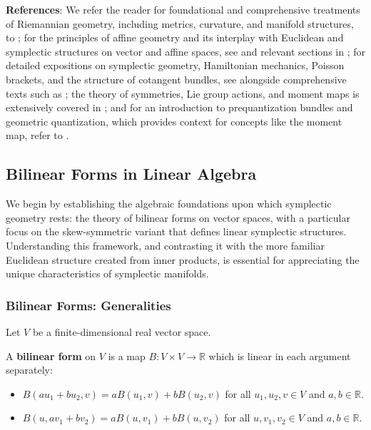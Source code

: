 \setcounter{tocdepth}{3}
\localtableofcontents

\textbf{References}: 
We refer the reader for foundational and comprehensive treatments of Riemannian geometry, including metrics, curvature, and manifold structures, to \cite{Lee2018Riemannian} \cite{DoCarmo1992Riemannian}; for the principles of affine geometry and its interplay with Euclidean and symplectic structures on vector and affine spaces, see \cite{Audin2003Geometry} and relevant sections in \cite{LibermannMarle1987Symplectic}; for detailed expositions on symplectic geometry, Hamiltonian mechanics, Poisson brackets, and the structure of cotangent bundles, see \cite{Arnold1989Mechanics} alongside comprehensive texts such as \cite{LibermannMarle1987Symplectic} \cite{GuilleminSternberg1984Symplectic}; the theory of symmetries, Lie group actions, and moment maps is extensively covered in \cite{MarsdenRatiu1999MechanicsSymmetry} \cite{GuilleminSternberg1984Symplectic} \cite{Souriau1997Structure} \cite{Olver1993LieGroups}; and for an introduction to prequantization bundles and geometric quantization, which provides context for concepts like the moment map, refer to \cite{Woodhouse1992GeometricQuantization} \cite{BatesWeinstein1997GeoQuant}.


\newpage 

\subsection{Bilinear Forms in Linear Algebra}

We begin by establishing the algebraic foundations upon which symplectic geometry rests: the theory of bilinear forms on vector spaces, with a particular focus on the skew-symmetric variant that defines linear symplectic structures. Understanding this framework, and contrasting it with the more familiar Euclidean structure created from inner products, is essential for appreciating the unique characteristics of symplectic manifolds.

\subsubsection{Bilinear Forms: Generalities}

Let $V$ be a finite-dimensional real vector space.

\begin{definition}
A \textbf{bilinear form} on $V$ is a map $B: V \times V \to \mathbb{R}$ which is linear in each argument separately:
\begin{itemize}
    \item $B(au_1 + bu_2, v) = a B(u_1, v) + b B(u_2, v)$ for all $u_1, u_2, v \in V$ and $a, b \in \mathbb{R}$.
    \item $B(u, av_1 + bv_2) = a B(u, v_1) + b B(u, v_2)$ for all $u, v_1, v_2 \in V$ and $a, b \in \mathbb{R}$.
\end{itemize}
\end{definition}

